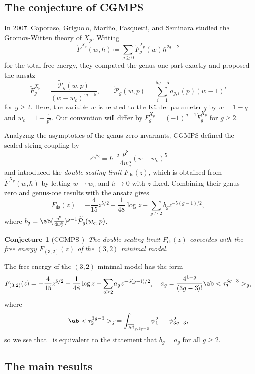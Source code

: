 \documentclass{amsart}
\newtheorem{conj}[thm]{Conjecture}
\theoremstyle{definition}
\theoremstyle{remark}
\theoremstyle{plain}
\theoremstyle{definition}
\theoremstyle{remark}
\newcommand{\Mbar}{\overline{\mathcal{M}}}
\newcommand{\mc}[1]{\mathcal{#1}}
\newcommand{\mr}[1]{\mathrm{#1}}
\newcommand{\wt}[1]{\widetilde{#1}}
\newcommand{\1}{\mathbf{1}}
\newcommand{\2}{\mathbf{2}}
\newcommand{\3}{\mathbf{3}}
\begin{document}
\subsection{The conjecture of CGMPS}%
\label{sub:The conjecture of CGMPS}

In 2007, Caporaso, Griguolo, Mari\~{n}o, Pasquetti, and Seminara studied the Gromov-Witten theory of \(X_p\). Writing
\[ \check{F}^{X_p}(w,\hbar) \coloneqq \sum_{g \geq 0} \check{F}_g^{X_p}(w) \hbar^{2g-2} \]
for the total free energy, they computed the genus-one part exactly and proposed the ansatz
\begin{equation}\label{eqn:cgmps ansatz}
    \check{F}_g^{X_p} = \frac{\wt{\mc{P}}_g(w,p)}{(w-w_c)^{5g-5}}, \qquad \wt{\mc{P}}_g(w,p) = \sum_{i=1}^{5g-5} a_{g,i}(p)(w-1)^i
\end{equation}
for \(g \geq 2\). Here, the variable \(w\) is related to the Kähler parameter \(q\) by \(w = 1-q\) and \(w_c = 1 - \frac{1}{p^2}\). Our convention will differ by \(F_g^{X_p} = (-1)^{g-1}\check{F}_g^{X_p}\) for \(g \geq 2\).

Analyzing the asymptotics of the genus-zero invariants, CGMPS defined the scaled string coupling by
\[ z^{5/2} = \hbar^{-2} \frac{p^8}{4w_c^5}(w-w_c)^5 \]
and introduced the \textit{double-scaling limit} \(F_{\mr{ds}}(z)\), which is obtained from \(\check{F}^{X_p}(w,\hbar)\) by letting \(w \to w_c\) and \(\hbar \to 0\) with \(z\) fixed. Combining their genus-zero and genus-one results with the ansatz gives
\[ F_{\mr{ds}}(z) = -\frac{4}{15}z^{5/2} - \frac{1}{48}\log z + \sum_{g \geq 2} b_g z^{-5(g-1)/2}, \]
where \(b_g = \ab(\frac{p^8}{4w_c^5})^{g-1}\wt{\mc{P}}_g(w_c,p)\).

\begin{conj}[CGMPS {\cite{CGMPS2007}}]%
\label{conj:cgmps}
    The double-scaling limit \(F_{\mr{ds}}(z)\) coincides with the free energy \(F_{(3,2)}(z)\) of the \((3,2)\) minimal model.
\end{conj}

The free energy of the \((3,2)\) minimal model has the form
\[ F_{(3,2)}(z) = -\frac{4}{15}z^{5/2} - \frac{1}{48}\log z + \sum_{g\geq2} a_g z^{-5(g-1)/2}, \quad a_g = \frac{4^{1-g}}{(3g-3)!}\ab<\tau_2^{3g-3}>_g, \]
where
\[ \ab<\tau_2^{3g-3}>_g \coloneqq \int_{\Mbar_{g,3g-3}} \psi_1^2 \cdots \psi_{3g-3}^2, \]
so we see that~ is equivalent to the statement that \(b_g = a_g\) for all \(g \geq 2\).

\subsection{The main results}%
\label{sub:The main results (Guo local P1)}
\end{document}
